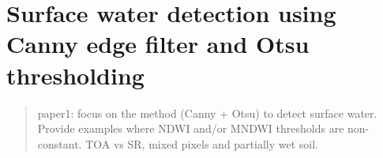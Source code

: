 \chapter{Surface water detection using Canny edge filter and Otsu thresholding}
\label{ch2}

\begin{abstract}
paper1: focus on the method (Canny + Otsu) to detect surface water. Provide examples where NDWI and/or MNDWI thresholds are non-constant. TOA vs SR, mixed pixels and partially wet soil.
\end{abstract}

\newpage



